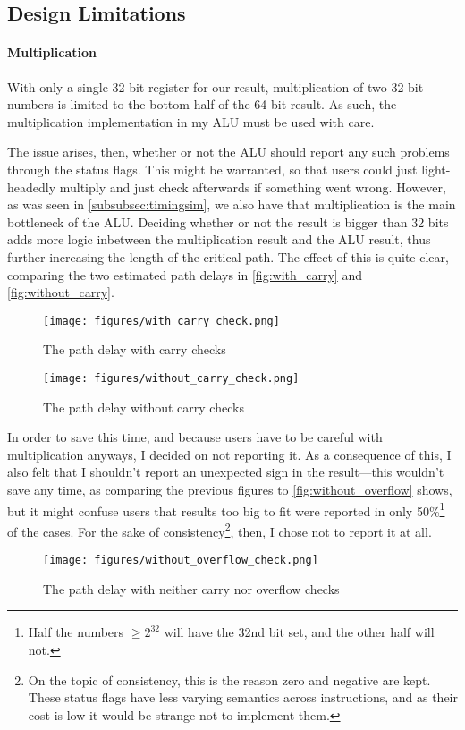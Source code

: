 \documentclass{article}
\begin{document}
\subsection{Design Limitations}
\label{subsec:limitations}

\paragraph{Multiplication}
With only a single 32-bit register for our result, multiplication of two 32-bit numbers is limited to the bottom half of the 64-bit result. As such, the multiplication implementation in my ALU must be used with care. 

The issue arises, then, whether or not the ALU should report any such problems through the status flags. This might be warranted, so that users could just light-headedly multiply and just check afterwards if something went wrong. However, as was seen in \autoref{subsubsec:timingsim}, we also have that multiplication is the main bottleneck of the ALU. Deciding whether or not the result is bigger than 32 bits adds more logic inbetween the multiplication result and the ALU result, thus further increasing the length of the critical path. The effect of this is quite clear, comparing the two estimated path delays in \autoref{fig:with_carry} and \autoref{fig:without_carry}.
\begin{figure}[htbp]
  \centering
  \texttt{[image: figures/with\_carry\_check.png]}
  \caption{The path delay with carry checks}
  \label{fig:with_carry}
\end{figure}
\begin{figure}[htbp]
  \centering
  \texttt{[image: figures/without\_carry\_check.png]}
  \caption{The path delay without carry checks}
  \label{fig:without_carry}
\end{figure} 
In order to save this time, and because users have to be careful with multiplication anyways, I decided on not reporting it. As a consequence of this, I also felt that I shouldn't report an unexpected sign in the result---this wouldn't save any time, as comparing the previous figures to \autoref{fig:without_overflow} shows, but it might confuse users that results too big to fit were reported in only 50\%\footnote{Half the numbers $\geq 2^{32}$ will have the 32nd bit set, and the other half will not.} of the cases. For the sake of consistency\footnote{On the topic of consistency, this is the reason zero and negative are kept. These status flags have less varying semantics across instructions, and as their cost is low it would be strange not to implement them.}, then, I chose not to report it at all.
\begin{figure}[htbp]
  \centering
  \texttt{[image: figures/without\_overflow\_check.png]}
  \caption{The path delay with neither carry nor overflow checks}
  \label{fig:without_overflow}
\end{figure}
\end{document}
